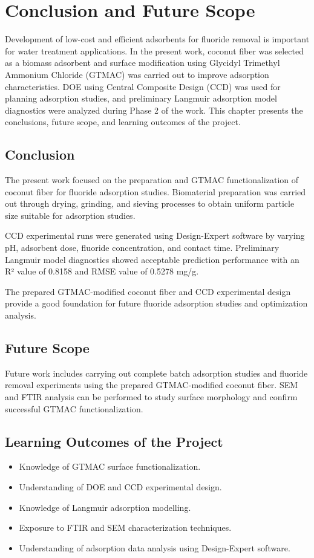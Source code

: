 \chapter{Conclusion and Future Scope}
Development of low-cost and efficient adsorbents for fluoride removal is important for water treatment applications. In the present work, coconut fiber was selected as a biomass adsorbent and surface modification using Glycidyl Trimethyl Ammonium Chloride (GTMAC) was carried out to improve adsorption characteristics. DOE using Central Composite Design (CCD) was used for planning adsorption studies, and preliminary Langmuir adsorption model diagnostics were analyzed during Phase 2 of the work. This chapter presents the conclusions, future scope, and learning outcomes of the project. 

\section{Conclusion}
The present work focused on the preparation and GTMAC functionalization of coconut fiber for fluoride adsorption studies. Biomaterial preparation was carried out through drying, grinding, and sieving processes to obtain uniform particle size suitable for adsorption studies. 

CCD experimental runs were generated using Design-Expert software by varying pH, adsorbent dose, fluoride concentration, and contact time. Preliminary Langmuir model diagnostics showed acceptable prediction performance with an R² value of 0.8158 and RMSE value of 0.5278 mg/g. 

The prepared GTMAC-modified coconut fiber and CCD experimental design provide a good foundation for future fluoride adsorption studies and optimization analysis. 

\section{Future Scope}
Future work includes carrying out complete batch adsorption studies and fluoride removal experiments using the prepared GTMAC-modified coconut fiber. SEM and FTIR analysis can be performed to study surface morphology and confirm successful GTMAC functionalization.
\section{Learning Outcomes of the Project}
\begin{itemize}
\item Knowledge of GTMAC surface functionalization.  
\item Understanding of DOE and CCD experimental design.  
\item Knowledge of Langmuir adsorption modelling.  
\item Exposure to FTIR and SEM characterization techniques.   
\item Understanding of adsorption data analysis using Design-Expert software.  

\end{itemize}

